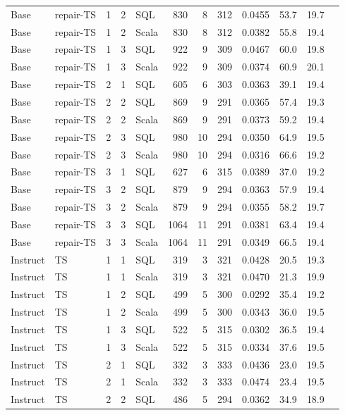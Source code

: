 {\begin{longtable}{@{}llcclrrrrrrc@{}}
Base & repair-TS & 1 & 2 & SQL & 830 & 8 & 312 & 0.0455 & 53.7 & 19.7 & \\
Base & repair-TS & 1 & 2 & Scala & 830 & 8 & 312 & 0.0382 & 55.8 & 19.4 & \\
Base & repair-TS & 1 & 3 & SQL & 922 & 9 & 309 & 0.0467 & 60.0 & 19.8 & \\
Base & repair-TS & 1 & 3 & Scala & 922 & 9 & 309 & 0.0374 & 60.9 & 20.1 & \\
Base & repair-TS & 2 & 1 & SQL & 605 & 6 & 303 & 0.0363 & 39.1 & 19.4 & \\
Base & repair-TS & 2 & 2 & SQL & 869 & 9 & 291 & 0.0365 & 57.4 & 19.3 & \\
Base & repair-TS & 2 & 2 & Scala & 869 & 9 & 291 & 0.0373 & 59.2 & 19.4 & \\
Base & repair-TS & 2 & 3 & SQL & 980 & 10 & 294 & 0.0350 & 64.9 & 19.5 & \\
Base & repair-TS & 2 & 3 & Scala & 980 & 10 & 294 & 0.0316 & 66.6 & 19.2 & \\
Base & repair-TS & 3 & 1 & SQL & 627 & 6 & 315 & 0.0389 & 37.0 & 19.2 & \\
Base & repair-TS & 3 & 2 & SQL & 879 & 9 & 294 & 0.0363 & 57.9 & 19.4 & \\
Base & repair-TS & 3 & 2 & Scala & 879 & 9 & 294 & 0.0355 & 58.2 & 19.7 & \\
Base & repair-TS & 3 & 3 & SQL & 1064 & 11 & 291 & 0.0381 & 63.4 & 19.4 & \\
Base & repair-TS & 3 & 3 & Scala & 1064 & 11 & 291 & 0.0349 & 66.5 & 19.4 & \\
Instruct & TS & 1 & 1 & SQL & 319 & 3 & 321 & 0.0428 & 20.5 & 19.3 & \\
Instruct & TS & 1 & 1 & Scala & 319 & 3 & 321 & 0.0470 & 21.3 & 19.9 & \\
Instruct & TS & 1 & 2 & SQL & 499 & 5 & 300 & 0.0292 & 35.4 & 19.2 & \\
Instruct & TS & 1 & 2 & Scala & 499 & 5 & 300 & 0.0343 & 36.0 & 19.5 & \\
Instruct & TS & 1 & 3 & SQL & 522 & 5 & 315 & 0.0302 & 36.5 & 19.4 & \\
Instruct & TS & 1 & 3 & Scala & 522 & 5 & 315 & 0.0334 & 37.6 & 19.5 & \\
Instruct & TS & 2 & 1 & SQL & 332 & 3 & 333 & 0.0436 & 23.0 & 19.5 & \\
Instruct & TS & 2 & 1 & Scala & 332 & 3 & 333 & 0.0474 & 23.4 & 19.5 & \\
Instruct & TS & 2 & 2 & SQL & 486 & 5 & 294 & 0.0362 & 34.9 & 18.9 & \\

\end{longtable}}
